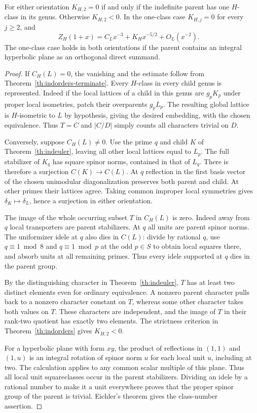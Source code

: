 \begin{corollary}\label{cor:indorders-oneclass}
For either orientation $K_{H,2}=0$ if and only if the indefinite parent has one $H$-class in its genus. Otherwise $K_{H,2}<0$. In the one-class case $K_{H,j}=0$ for every $j\ge2$, and
\[
 Z_H(1+x)=C_Lx^{-3}+K_Hx^{-5/2}+O_L(x^{-2}).
\]
The one-class case holds in both orientations if the parent contains an integral hyperbolic plane as an orthogonal direct summand.
\end{corollary}
\begin{proof}
If $C_H(L)=0$, the vanishing and the estimate follow from Theorem~\ref{th:indorders-terminate}. Every $H$-class in every child genus is represented. Indeed if the local lattices of a child in this genus are $g_p K_p$ under proper local isometries, patch their overparents $g_p L_p$. The resulting global lattice is $H$-isometric to $L$ by hypothesis, giving the desired embedding, with the chosen equivalence. Thus $T=C$ and $|C/D|$ simply counts all characters trivial on $D$.

Conversely, suppose $C_H(L)\ne0$. Use the prime $q$ and child $K$ of Theorem~\ref{th:indeuler}, leaving all other local lattices equal to $L_p$. The full stabilizer of $K_q$ has square spinor norms, contained in that of $L_q$. There is therefore a surjection $C(K)\to C(L)$. At $q$ reflection in the first basis vector of the chosen unimodular diagonalization preserves both parent and child. At other primes their lattices agree. Taking common improper local symmetries gives $\delta_K\mapsto\delta_L$, hence a surjection in either orientation. 

The image of the whole occurring subset $T$ in $C_H(L)$ is zero. Indeed away from $q$ local transporters are parent stabilizers. At $q$ all units are parent spinor norms. The uniformizer idele at $q$ also dies in $C(L)$: divide by rational $q$, use $q\equiv1\bmod8$ and $q\equiv1\bmod p$ at the odd $p\in S$ to obtain local squares there, and absorb units at all remaining primes. Thus every idele supported at $q$ dies in the parent group. 

By the distinguishing character in Theorem~\ref{th:indeuler}, $T$ has at least two distinct elements even for ordinary equivalence. A nonzero parent character pulls back to a nonzero character constant on $T$, whereas some other character takes both values on $T$. These characters are independent, and the image of $T$ in their rank-two quotient has exactly two elements. The strictness criterion in Theorem~\ref{th:indorders} gives $K_{H,2}<0$.

For a hyperbolic plane with form $xy$, the product of reflections in $(1,1)$ and $(1,u)$ is an integral rotation of spinor norm $u$ for each local unit $u$, including at two. The calculation applies to any common scalar multiple of this plane. Thus all local unit squareclasses occur in the parent stabilizers. Dividing an idele by a rational number to make it a unit everywhere proves that the proper spinor group of the parent is trivial. Eichler's theorem gives the class-number assertion.
\end{proof}
